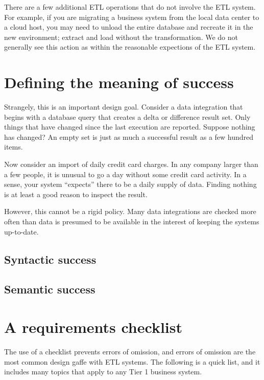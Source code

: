 \documentclass[11pt,letterpaper,twosided]{memoir}
\begin{document}
There are a few additional ETL operations that do not involve
the ETL system. For example, if you are migrating a business system
from the local data center to a cloud host, you may need to unload
the entire database and recreate it in the new environment; extract
and load without the transformation. We do not generally see this
action as within the reasonable expections of the ETL system.

\section{Defining the meaning of success}
\label{sec:success}

Strangely, this is an important design goal. Consider a data
integration that begins with a database query that creates a delta
or difference result set. Only things that have changed since the
last execution are reported. Suppose nothing has changed? An empty
set is just as much a successful result as a few hundred items.

Now consider an import of daily credit card charges. In any company 
larger than a few people, it is unusual to go a day without some
credit card activity. In a sense, your system ``expects'' there to
be a daily supply of data. Finding nothing is at least a good
reason to inspect the result.

However, this cannot be a rigid policy. Many data integrations
are checked more often than data is presumed to be available in
the interest of keeping the systems up-to-date. 

\subsection{Syntactic success}

\subsection{Semantic success}

\section{A requirements checklist}

The use of a checklist prevents errors of omission, and errors
of omission are the most common design gaffe with ETL systems. The
following is a quick list, and it includes many topics that apply
to any Tier 1 business system.
\end{document}
